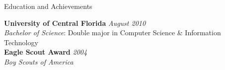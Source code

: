 \documentclass{resume} %
\begin{document}

\begin{rSection}{Education and Achievements}

{\bf University of Central Florida} \hfill {\em August 2010} \\ 
\textit{Bachelor of Science}: Double major in Computer Science \& Information Technology \\
{\bf Eagle Scout Award} \hfill {\em 2004} \\ 
\textit{Boy Scouts of America} \\
\end{rSection}





\end{document}
